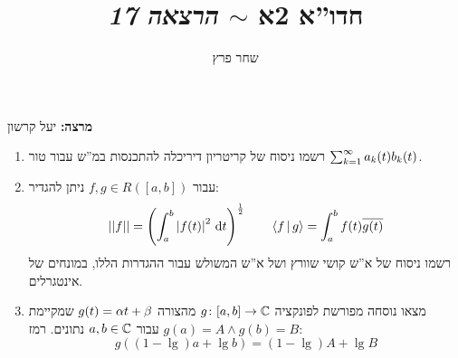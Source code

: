 \documentclass[]{../../../../tex/classes/styledArticle}
\author{שחר פרץ}
\title{חדו''א 2א $\sim$ \textit{הרצאה 17}}
\begin{document}
	\maketitle
	\textbf{מרצה: }יעל קרשון
	
	\begin{Exercise}[פתיחה]
		\begin{enumerate}
			\item רשמו ניסוח של קריטריון דיריכלה להתכנסות במ''ש עבור טור $\sum_{k = 1}^{\infty} a_k(t)b_k(t)$. 
			\item עבור $f, g \in R([a, b])$ ניתן להגדיר: 
			\[ \left \vert \left \vert f \right \vert \right \vert = \left ( \int^{b}_a \left \lvert f(t) \right \rvert^{2}\,\mathrm{d}t \right )^{\frac{1}{2}} \quad\quad \left \langle f \,\middle|\, g \right \rangle = \int^{b}_a f(t)\overline{g(t)} \]
			רשמו ניסוח של א''ש קושי שוורץ ושל א''ש המשולש עבור ההגדרות הללו, במונחים של אינטגרלים. 
			\item מצאו נוסחה מפורשת לפונקציה $g \colon [a, b] \to \mathbb{C}$ מהצורה $g(t) = \alpha t + \beta$ שמקיימת $g(a) = A \land g(b)= B$ עבור $a, b \in \mathbb{C}$ נתונים. רמז: 
			\[ g((1 - \lg)a + \lg b) = (1 - \lg)A  +\lg B \]
		\end{enumerate}
	\end{Exercise}
	
\end{document}
